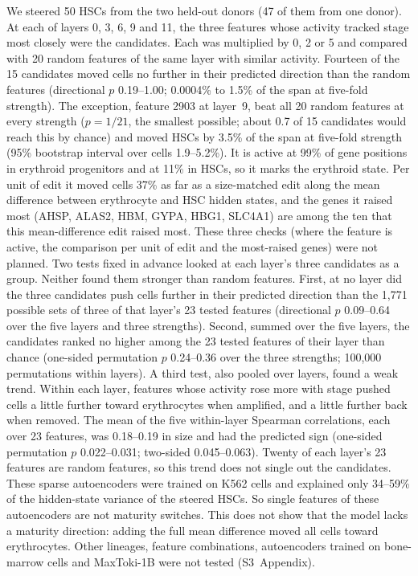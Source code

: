 We steered 50 HSCs from the two held-out donors (47 of them from one
donor). At each of layers 0, 3, 6, 9 and 11, the three features whose
activity tracked stage most closely were the candidates. Each was
multiplied by 0, 2 or 5 and compared with 20 random features of the same
layer with similar activity. Fourteen of the 15 candidates moved cells no
further in their predicted direction than the random features
(directional $p$ 0.19--1.00; 0.0004\% to 1.5\% of the span at five-fold
strength). The exception, feature 2903 at layer~9, beat all 20 random
features at every strength ($p = 1/21$, the smallest possible; about 0.7
of 15 candidates would reach this by chance) and moved HSCs by 3.5\% of
the span at five-fold strength (95\% bootstrap interval over cells
1.9--5.2\%). It is active at 99\% of gene positions in erythroid
progenitors and at 11\% in HSCs, so it marks the erythroid state. Per
unit of edit it moved cells 37\% as far as a size-matched edit along the
mean difference between erythrocyte and HSC hidden states, and the genes
it raised most (AHSP, ALAS2, HBM, GYPA, HBG1, SLC4A1) are among the ten
that this mean-difference edit raised most. These three checks (where
the feature is active, the comparison per unit of edit and the
most-raised genes) were not planned. Two tests fixed in advance looked at
each layer's three candidates as a group. Neither found them stronger
than random features. First, at no layer did the three candidates push
cells further in their predicted direction than the 1,771 possible sets
of three of that layer's 23 tested features (directional $p$ 0.09--0.64
over the five layers and three strengths). Second, summed over the five
layers, the candidates ranked no higher among the 23 tested features of
their layer than chance (one-sided permutation $p$ 0.24--0.36 over the
three strengths; 100,000 permutations within layers). A third test, also
pooled over layers, found a weak trend. Within each layer, features whose activity rose
more with stage pushed cells a little further toward erythrocytes when
amplified, and a little further back when removed. The mean of the five
within-layer Spearman correlations, each over 23 features, was
0.18--0.19 in size and had the predicted sign (one-sided permutation $p$
0.022--0.031; two-sided 0.045--0.063). Twenty of each layer's 23
features are random features, so this trend does not single out the
candidates. These sparse autoencoders were trained on K562 cells and explained only
34--59\% of the hidden-state variance of the steered HSCs. So single
features of these autoencoders are not maturity switches. This does not
show that the model lacks a maturity direction: adding the full mean
difference moved all cells toward erythrocytes. Other lineages, feature
combinations, autoencoders trained on bone-marrow cells and MaxToki-1B
were not tested (S3~Appendix).

